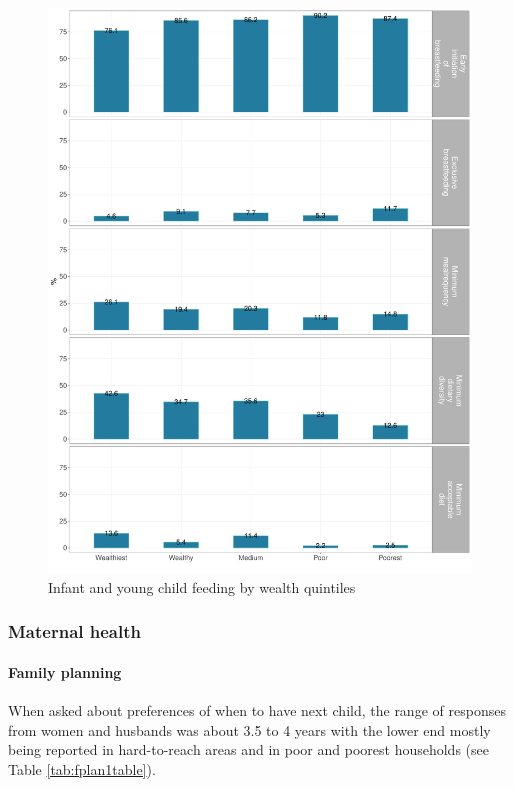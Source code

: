 \documentclass[12pt,a4paper]{article}
\let\oldparagraph\paragraph
\renewcommand{\paragraph}[1]{\oldparagraph{#1}\mbox{}}
\begin{document}
\begin{figure}[H]

{\centering \includegraphics{kayinReport_files/figure-latex/iycf2plot-1} 

}

\caption{Infant and young child feeding by wealth quintiles}\label{fig:iycf2plot}
\end{figure}

\hypertarget{mhealth-results}{%
\subsubsection{Maternal health}\label{mhealth-results}}

\hypertarget{fplan-results}{%
\paragraph{Family planning}\label{fplan-results}}

When asked about preferences of when to have next child, the range of responses from women and husbands was about 3.5 to 4 years with the lower end mostly being reported in hard-to-reach areas and in poor and poorest households (see Table \ref{tab:fplan1table}).
\end{document}
